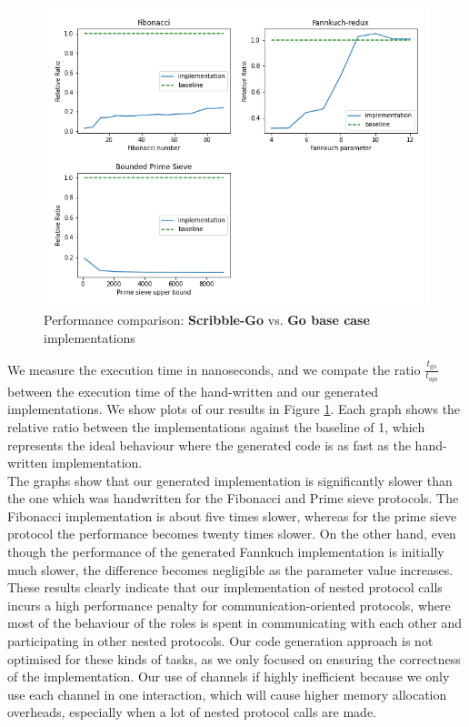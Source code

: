 \documentclass[12pt,twoside]{report}
\begin{document}
\begin{figure}[h!]
    \centering
    \includegraphics[scale=0.6]{figures/performance.png}
    \caption{Performance comparison: \textbf{Scribble-Go} vs. \textbf{Go base case} implementations}
    \label{performance-graphs}
\end{figure}

We measure the execution time in nanoseconds, and we compate the ratio $\frac{t_{\text{go}}}{t_{\textit{api}}}$ between the execution time of the hand-written and our generated implementations. We show plots of our results in Figure \ref{performance-graphs}. Each graph shows the relative ratio between the implementations against the baseline of 1, which represents the ideal behaviour where the generated code is as fast as the hand-written implementation.\\

The graphs show that our generated implementation is significantly slower than the one which was handwritten for the Fibonacci and Prime sieve protocols. The Fibonacci implementation is about five times slower, whereas for the prime sieve protocol the performance becomes twenty times slower. On the other hand, even though the performance of the generated Fannkuch implementation is initially much slower, the difference becomes negligible as the parameter value increases.\\

These results clearly indicate that our implementation of nested protocol calls incurs a high performance penalty for communication-oriented protocols, where most of the behaviour of the roles is spent in communicating with each other and participating in other nested protocols. Our code generation approach is not optimised for these kinds of tasks, as we only focused on ensuring the correctness of the implementation. Our use of channels if highly inefficient because we only use each channel in one interaction, which will cause higher memory allocation overheads, especially when a lot of nested protocol calls are made.\\
\end{document}
